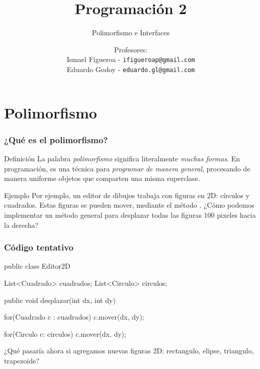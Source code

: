 \documentclass{beamer}
\title[\textbf{Programación 2}]{\textbf{Programación 2}}
\subtitle{Polimorfismo e Interfaces}
\author[IF-EG]
{Profesores:\\
  Ismael Figueroa -  \texttt{\small ifigueroap@gmail.com} \\
  \vspace{0.5mm}
  Eduardo Godoy - \texttt{\small eduardo.gl@gmail.com}
}
\institute[Universidad de Valparaíso]
\date{}
\begin{document}
\begin{frame}
  \titlepage
\end{frame}

\section{Polimorfismo}

\begin{frame}
  \frametitle{¿Qué es el polimorfismo?}

  \begin{block}{Definición}
    La palabra \emph{polimorfismo} significa literalmente \emph{muchas
      formas}. En programación, es una técnica para \emph{programar de
      manera general}, procesando de manera uniforme objetos que
    comparten una misma superclase.
  \end{block}

  \begin{block}{Ejemplo}
    Por ejemplo, un editor de dibujos trabaja con figuras en 2D:
    círculos y cuadrados. Estas figuras se pueden mover,
    mediante el método . ¿Cómo podemos implementar un
    método general para desplazar todas las figuras 100 pixeles hacia
    la derecha?
  \end{block}
  
\end{frame}

\begin{frame}[fragile]
  \frametitle{Código tentativo}

  \begin{jsmall}
    public class Editor2D {

      List<Cuadrado> cuadrados;
      List<Circulo> circulos;
      
      public void desplazar(int dx, int dy) {

        for(Cuadrado c : cuadrados) {
          c.mover(dx, dy);
        }

        for(Circulo c: circulos) {
          c.mover(dx, dy);
        }
      }      
    }    
  \end{jsmall}

  ¿Qué pasaría ahora si agregamos nuevas figuras 2D: rectangulo,
  elipse, triangulo, trapezoide?
  
\end{frame}
\end{document}
